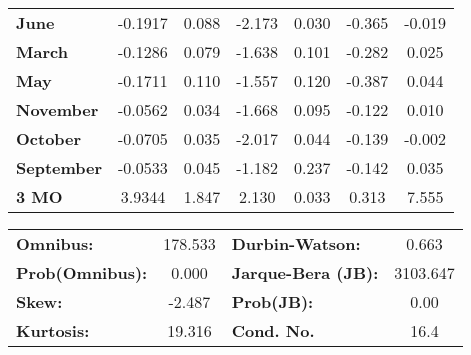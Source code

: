 \begin{center}
\begin{tabular}{lcccccc}
\textbf{June}      &      -0.1917  &        0.088     &    -2.173  &         0.030        &       -0.365    &       -0.019     \\
\textbf{March}     &      -0.1286  &        0.079     &    -1.638  &         0.101        &       -0.282    &        0.025     \\
\textbf{May}       &      -0.1711  &        0.110     &    -1.557  &         0.120        &       -0.387    &        0.044     \\
\textbf{November}  &      -0.0562  &        0.034     &    -1.668  &         0.095        &       -0.122    &        0.010     \\
\textbf{October}   &      -0.0705  &        0.035     &    -2.017  &         0.044        &       -0.139    &       -0.002     \\
\textbf{September} &      -0.0533  &        0.045     &    -1.182  &         0.237        &       -0.142    &        0.035     \\
\textbf{3 MO}      &       3.9344  &        1.847     &     2.130  &         0.033        &        0.313    &        7.555     \\
\bottomrule
\end{tabular}
\begin{tabular}{lclc}
\textbf{Omnibus:}       & 178.533 & \textbf{  Durbin-Watson:     } &    0.663  \\
\textbf{Prob(Omnibus):} &   0.000 & \textbf{  Jarque-Bera (JB):  } & 3103.647  \\
\textbf{Skew:}          &  -2.487 & \textbf{  Prob(JB):          } &     0.00  \\
\textbf{Kurtosis:}      &  19.316 & \textbf{  Cond. No.          } &     16.4  \\
\bottomrule
\end{tabular}
\end{center}

